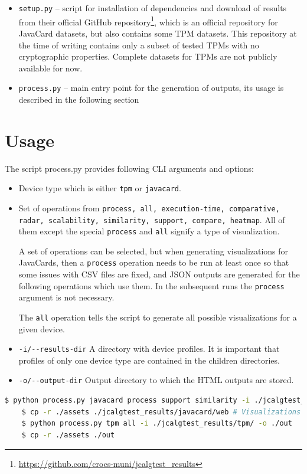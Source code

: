 \begin{itemize}
    \item \texttt{setup.py} -- script for installation of dependencies and download of results from their official GitHub repository\footnote{\url{https://github.com/crocs-muni/jcalgtest_results}}, which is an official repository for JavaCard datasets, but also contains some TPM datasets. This repository at the time of writing contains only a subset of tested TPMs with no cryptographic properties. Complete datasets for TPMs are not publicly available for now. 
    \item \texttt{process.py} -- main entry point for the generation of outputs, its usage is described in the following section
\end{itemize}

\section{Usage}
The script process.py provides following CLI arguments and options:

\begin{itemize}
    \item Device type which is either \texttt{tpm} or \texttt{javacard}.
    \item Set of operations from \texttt{process, all, execution-time, comparative, radar, scalability, similarity, support, compare, heatmap}. All of them except the special \texttt{process} and \texttt{all} signify a type of visualization.
    
    A set of operations can be selected, but when generating visualizations for JavaCards, then a \texttt{process} operation needs to be run at least once so that some issues with CSV files are fixed, and JSON outputs are generated for the following operations which use them. In the subsequent runs the \texttt{process} argument is not necessary.
    
    The \texttt{all} operation tells the script to generate all possible visualizations for a given device.
    \item \texttt{-i/-{}-results-dir} A directory with device profiles. It is important that profiles of only one device type are contained in the children directories.
    \item \texttt{-o/-{}-output-dir} Output directory to which the HTML outputs are stored. 
\end{itemize}

\begin{lstlisting}[language=bash]
    $ python process.py javacard process support similarity -i ./jcalgtest_results/javacard/ -o ./jcalgtest_results/javacard/web
    $ cp -r ./assets ./jcalgtest_results/javacard/web # Visualizations need assets folder
    $ python process.py tpm all -i ./jcalgtest_results/tpm/ -o ./out
    $ cp -r ./assets ./out
\end{lstlisting}

